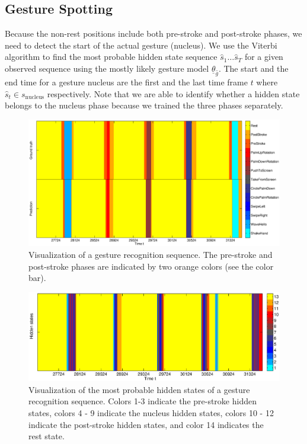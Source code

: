\subsection{Gesture Spotting}
Because the non-rest positions include both pre-stroke and post-stroke phases, we need
to detect the start of the actual gesture (nucleus). We use the Viterbi algorithm
to find the most probable hidden state sequence $\hat{s}_1\ldots\hat{s}_T$ for a given observed sequence using 
the mostly likely gesture model $\underline{\theta}_{\hat{g}}$. The start and the end time for a gesture nucleus are
the first and the last time frame $t$ where $\hat{s}_t\in s_{\text{nucleus}}$ respectively. Note that
we are able to identify whether a hidden state belongs to the nucleus phase because we trained the three phases
separately.

\begin{figure}[tb]
\centering
\includegraphics[trim={4cm 1cm 0cm 0.6cm}, clip,
width=1\columnwidth]{figures/gesture.eps} \caption{Visualization of a gesture
recognition sequence.
The pre-stroke and post-stroke phases are indicated by two orange colors (see the color bar).}
\label{fig:decoding}
\end{figure}

\begin{figure}[tb]
\centering
\includegraphics[trim={3.5cm 0cm 0.5cm 0cm}, clip,
width=1\columnwidth]{figures/hiddenstates.eps} \caption{Visualization of the
most probable hidden states of a gesture recognition sequence.
Colors 1-3 indicate the pre-stroke hidden states, colors 4 - 9
indicate the nucleus hidden states, colors 10 - 12 indicate the post-stroke
hidden states, and color 14 indicates the rest state.}
\label{fig:hiddenstates}
\end{figure}

